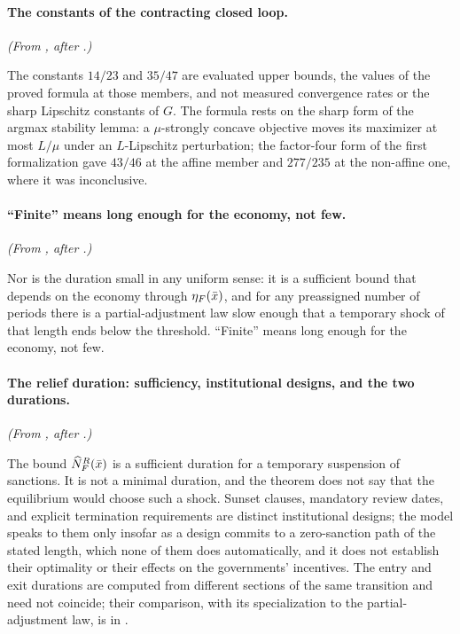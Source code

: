 \paragraph{The constants of the contracting closed loop.} \emph{(From , after .)}

The constants $14/23$ and $35/47$ are evaluated upper bounds,
the values of the proved formula at those members, and not measured
convergence rates or the sharp Lipschitz constants of $G$. The formula rests on the sharp form of the argmax
stability lemma: a $\mu$-strongly concave objective moves its maximizer at
most $L/\mu$ under an $L$-Lipschitz perturbation; the factor-four form of the
first formalization gave $43/46$ at the affine member and $277/235$ at the
non-affine one, where it was inconclusive.

\paragraph{``Finite'' means long enough for the economy, not few.} \emph{(From , after .)}

Nor is the duration small in any uniform sense: it is
a sufficient bound that depends on the economy through $\eta_{F}(\bar x)$,
and for any preassigned number of periods there is a partial-adjustment
law slow enough that a temporary shock of that length ends below the
threshold. ``Finite'' means long enough for the economy, not few.

\paragraph{The relief duration: sufficiency, institutional designs, and the two durations.} \emph{(From , after .)}

The bound $\widehat N^{R}_{F}(\bar x)$ is a sufficient duration for a
temporary suspension of sanctions. It is not a minimal duration, and
the theorem does not say that the equilibrium would choose such a shock.
Sunset clauses, mandatory review dates, and explicit termination
requirements are distinct institutional designs; the model speaks to them
only insofar as a design commits to a zero-sanction path of the stated
length, which none of them does automatically, and it does not establish
their optimality or their effects on the governments' incentives. The entry
and exit durations are computed from different sections of the same transition
and need not coincide; their comparison, with its specialization to the partial-adjustment law, is in
.

